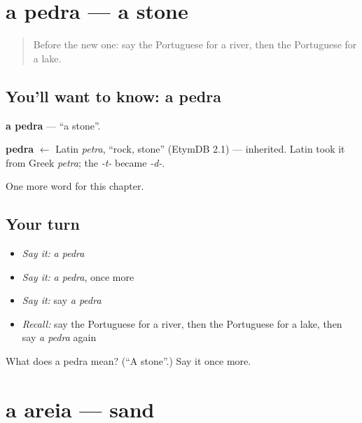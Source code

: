 \section[a pedra]{a pedra — a stone}

\label{lesson:PT-C57-pedra}



\begin{quote}
Before the new one: say the Portuguese for a river, then the Portuguese for a lake.
\end{quote}

\subsection*{You'll want to know: a pedra}
\textbf{a pedra} — \textquotedblleft{}a stone\textquotedblright{}.

\begin{cousinweb}
\textbf{pedra} $\leftarrow$ Latin \emph{petra}, \textquotedblleft{}rock, stone\textquotedblright{} (EtymDB 2.1) — inherited. Latin took it from Greek \emph{petra}; the \emph{-t-} became \emph{-d-}.
\end{cousinweb}

\begin{grammarlens}[title={What you've built}]
One more word for this chapter.
\end{grammarlens}

\subsection*{Your turn}
\begin{itemize}
\raggedright
  \item \emph{Say it:} \emph{a pedra}
  \item \emph{Say it:} \emph{a pedra}, once more
  \item \emph{Say it:} say \emph{a pedra}
  \item \emph{Recall:} say the Portuguese for a river, then the Portuguese for a lake, then say \emph{a pedra} again
\end{itemize}

\begin{tcolorbox}[breakable,colback=teal!4,colframe=teal!35!black,title={Before you move on}]
What does a pedra mean? (\textquotedblleft{}A stone\textquotedblright{}.) Say it once more.
\end{tcolorbox}
\section[a areia]{a areia — sand}

